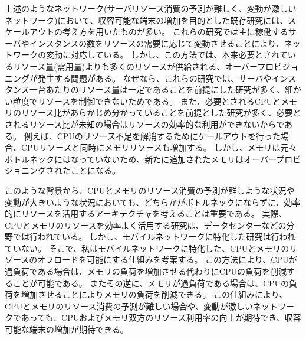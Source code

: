 \documentclass[a4j]{ujarticle}
\begin{document}
上述のようなネットワーク(サーバリソース消費の予測が難しく、変動が激しいネットワーク)において、収容可能な端末の増加を目的とした既存研究には、スケールアウトの考え方を用いたものが多い。
これらの研究では主に稼働するサーバやインスタンスの数をリソースの需要に応じて変動させることにより、ネットワークの変動に対応している。
しかし、この方法では、本来必要とされているリソース量(需用量)よりも多くのリソースが供給される、オーバープロビジョニングが発生する問題がある。
なぜなら、これらの研究では、サーバやインスタンス一台あたりのリソース量は一定であることを前提にした研究が多く、細かい粒度でリソースを制御できないためである。
また、必要とされるCPUとメモリのリソース比があらかじめ分かっていることを前提とした研究が多く、必要とされるリソース比が未知の場合はリソースの効率的な利用ができないからである。
例えば、CPUのリソース不足を解消するためにケールアウトを行った場合、CPUリソースと同時にメモリリソースも増加する。
しかし、メモリは元々ボトルネックにはなっていないため、新たに追加されたメモリはオーバープロビジョニングされたことになる。


このような背景から、CPUとメモリのリソース消費の予測が難しような状況や変動が大きいような状況においても、どちらかがボトルネックにならずに、効率的にリソースを活用するアーキテクチャを考えることは重要である。
実際、CPUとメモリのリソースを効率よく活用する研究は、データセンターなどの分野では行われている\cite{TechnoEconomicFrameworkforCloudInfrastructureACostStudyofResourceDisaggregation}。
しかし、モバイルネットワークに特化した研究は行われていない。
そこで、私はモバイルネットワークに特化した、CPUとメモリのリソースのオフロードを可能にする仕組みを考案する。
この方法により、CPUが過負荷である場合は、メモリの負荷を増加させる代わりにCPUの負荷を削減することが可能である。
またその逆に、メモリが過負荷である場合は、CPUの負荷を増加させることによりメモリの負荷を削減できる。
この仕組みにより、CPUとメモリのリソース消費の予測が難しい場合や、変動が激しいネットワークであっても、CPUおよびメモリ双方のリソース利用率の向上が期待でき、収容可能な端末の増加が期待できる。


\end{document}
